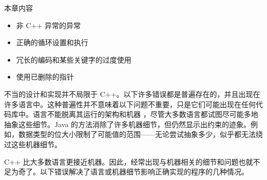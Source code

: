本章内容

\begin{itemize}
\item
非 C++ 异常的异常

\item
正确的循环设置和执行

\item
冗长的编码和某些关键字的过度使用

\item
使用已删除的指针
\end{itemize}

不当的设计和实现并不局限于 C++。以下许多错误都是普遍存在的，并且出现在许多语言中。这种普遍性并不意味着以下问题不重要，只是它们可能出现在任何代码库中。语言不能脱离其运行的架构和机器 ，尽管大多数语言都试图尽可能多地抽象这些细节。Java 的方法消除了许多机器细节，但仍然显示出约束的迹象。例如，数据类型的位大小限制了可能值的范围——无论尝试抽象多少，似乎都无法绕过这些机器细节。

C++ 比大多数语言更接近机器。因此，经常出现与机器相关的细节和问题也就不足为奇了。以下错误解决了语言或机器细节影响正确实现的程序的几种情况。

